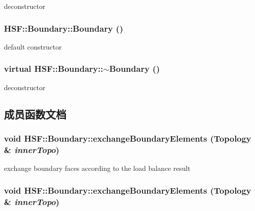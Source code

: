 deconstructor \hypertarget{classHSF_1_1Boundary_a66741eb92598adf5e34a07568a0a8778}{
\subsubsection[{Boundary}]{\setlength{\rightskip}{0pt plus 5cm}HSF::Boundary::Boundary ()}}
\label{classHSF_1_1Boundary_a66741eb92598adf5e34a07568a0a8778}


default constructor \hypertarget{classHSF_1_1Boundary_a8249905be447e99edf81401f17093f5e}{
\subsubsection[{$\sim$Boundary}]{\setlength{\rightskip}{0pt plus 5cm}virtual HSF::Boundary::$\sim$Boundary ()}}
\label{classHSF_1_1Boundary_a8249905be447e99edf81401f17093f5e}


deconstructor 

\subsection{成员函数文档}
\hypertarget{classHSF_1_1Boundary_a247677270031ff60c915e7afb1a1de51}{
\subsubsection[{exchangeBoundaryElements}]{\setlength{\rightskip}{0pt plus 5cm}void HSF::Boundary::exchangeBoundaryElements ({\bf Topology} \& {\em innerTopo})}}
\label{classHSF_1_1Boundary_a247677270031ff60c915e7afb1a1de51}


exchange boundary faces according to the load balance result \hypertarget{classHSF_1_1Boundary_a247677270031ff60c915e7afb1a1de51}{
\subsubsection[{exchangeBoundaryElements}]{\setlength{\rightskip}{0pt plus 5cm}void HSF::Boundary::exchangeBoundaryElements ({\bf Topology} \& {\em innerTopo})}}
\label{classHSF_1_1Boundary_a247677270031ff60c915e7afb1a1de51}


